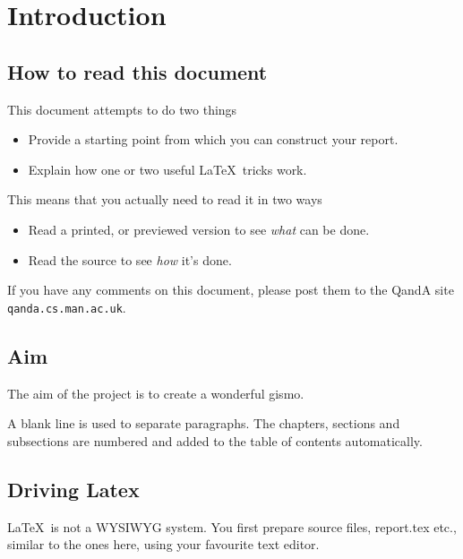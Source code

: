 \chapter{Introduction}
\label{cha:intro}

\section{How to read this document}
This document attempts to do two things
\begin{itemize}
\item Provide a starting point from which you can construct your
  report.
\item Explain how one or two useful \LaTeX\ tricks work.
\end{itemize}
This means that you actually need to read it in two ways
\begin{itemize}
\item Read a printed, or previewed version to see \emph{what} can be done.
\item Read the source to see \emph{how} it's done.
\end{itemize}
If you have any comments on this document, please post them to the QandA site
 \texttt{qanda.cs.man.ac.uk}.

\section{Aim}
\label{sec:aim}

The aim of the project is to create a wonderful gismo.

A blank line is used to separate paragraphs. The chapters, sections
and subsections are numbered and added to the table of contents
automatically.

\section{Driving Latex}

\LaTeX\ is not a WYSIWYG system. You first prepare source files,
\textsf{report.tex} etc., similar to the ones here, using your
favourite text editor.

